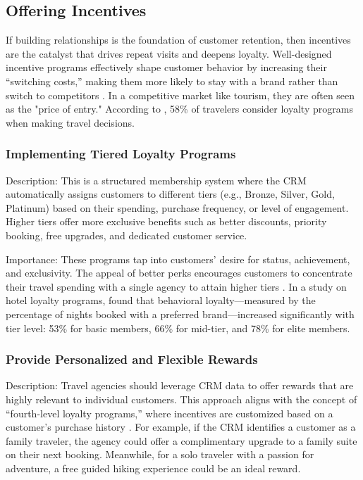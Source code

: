 \subsection{Offering Incentives}
If building relationships is the foundation of customer retention, then incentives are the catalyst that drives repeat visits and deepens loyalty. Well-designed incentive programs effectively shape customer behavior by increasing their “switching costs,” making them more likely to stay with a brand rather than switch to competitors \cite{lian2021effects}. In a competitive market like tourism, they are often seen as the "price of entry." According to \cite{expedia2017new}, 58\% of travelers consider loyalty programs when making travel decisions.

\subsubsection{Implementing Tiered Loyalty Programs}
Description: This is a structured membership system where the CRM automatically assigns customers to different tiers (e.g., Bronze, Silver, Gold, Platinum) based on their spending, purchase frequency, or level of engagement. Higher tiers offer more exclusive benefits such as better discounts, priority booking, free upgrades, and dedicated customer service.

Importance: These programs tap into customers' desire for status, achievement, and exclusivity. The appeal of better perks encourages customers to concentrate their travel spending with a single agency to attain higher tiers \cite{rahman2022effect}. In a study on hotel loyalty programs, \cite{tanford2013impact} found that behavioral loyalty—measured by the percentage of nights booked with a preferred brand—increased significantly with tier level: 53\% for basic members, 66\% for mid-tier, and 78\% for elite members.

\subsubsection{Provide Personalized and Flexible Rewards}
Description: Travel agencies should leverage CRM data to offer rewards that are highly relevant to individual customers. This approach aligns with the concept of “fourth-level loyalty programs,” where incentives are customized based on a customer's purchase history \cite{chetty2020loyalty}. For example, if the CRM identifies a customer as a family traveler, the agency could offer a complimentary upgrade to a family suite on their next booking. Meanwhile, for a solo traveler with a passion for adventure, a free guided hiking experience could be an ideal reward.

